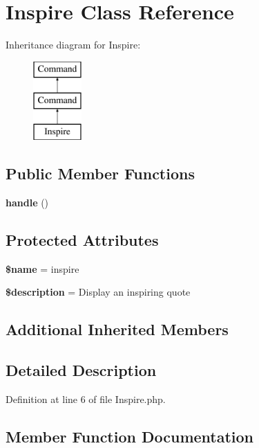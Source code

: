 \section{Inspire Class Reference}
\label{class_app_1_1_console_1_1_commands_1_1_inspire}
Inheritance diagram for Inspire\+:\begin{figure}[H]
\begin{center}
\leavevmode
\includegraphics[height=3.000000cm]{class_app_1_1_console_1_1_commands_1_1_inspire}
\end{center}
\end{figure}
\subsection*{Public Member Functions}
\begin{DoxyCompactItemize}
\item 
{\bf handle} ()
\end{DoxyCompactItemize}
\subsection*{Protected Attributes}
\begin{DoxyCompactItemize}
\item 
{\bf \$name} = \textquotesingle{}inspire\textquotesingle{}
\item 
{\bf \$description} = \textquotesingle{}Display an inspiring quote\textquotesingle{}
\end{DoxyCompactItemize}
\subsection*{Additional Inherited Members}


\subsection{Detailed Description}


Definition at line 6 of file Inspire.\+php.



\subsection{Member Function Documentation}
